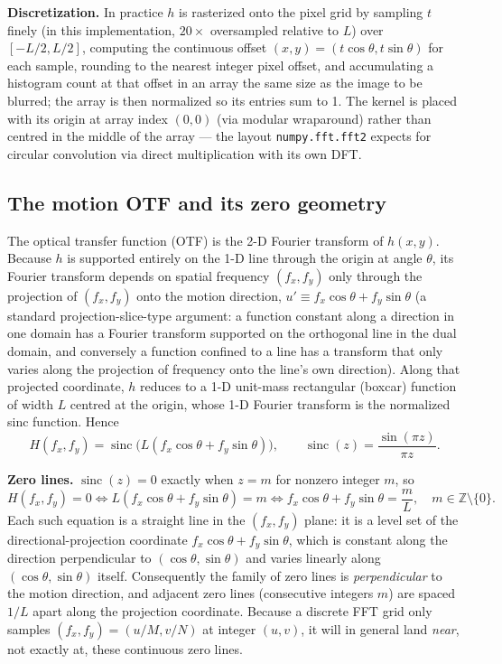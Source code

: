 \documentclass[11pt]{article}
\begin{document}
\textbf{Discretization.} In practice $h$ is rasterized onto the pixel grid by sampling $t$
finely (in this implementation, $20\times$ oversampled relative to $L$) over $[-L/2, L/2]$,
computing the continuous offset $(x,y) = (t\cos\theta, t\sin\theta)$ for each sample, rounding to
the nearest integer pixel offset, and accumulating a histogram count at that offset in an array
the same size as the image to be blurred; the array is then normalized so its entries sum to 1.
The kernel is placed with its origin at array index $(0,0)$ (via modular wraparound) rather than
centred in the middle of the array — the layout \texttt{numpy.fft.fft2} expects for circular
convolution via direct multiplication with its own DFT.

\subsection{The motion OTF and its zero geometry}

The optical transfer function (OTF) is the 2-D Fourier transform of $h(x,y)$. Because $h$ is
supported entirely on the 1-D line through the origin at angle $\theta$, its Fourier transform
depends on spatial frequency $(f_x,f_y)$ only through the projection of $(f_x,f_y)$ onto the
motion direction, $u' \equiv f_x\cos\theta + f_y\sin\theta$ (a standard projection-slice-type
argument: a function constant along a direction in one domain has a Fourier transform supported
on the orthogonal line in the dual domain, and conversely a function confined to a line has a
transform that only varies along the projection of frequency onto the line's own direction).
Along that projected coordinate, $h$ reduces to a 1-D unit-mass rectangular (boxcar) function of
width $L$ centred at the origin, whose 1-D Fourier transform is the normalized sinc function.
Hence
\[
H(f_x,f_y) = \operatorname{sinc}\!\big(L(f_x\cos\theta+f_y\sin\theta)\big),
\qquad \operatorname{sinc}(z) = \frac{\sin(\pi z)}{\pi z}.
\]

\textbf{Zero lines.} $\operatorname{sinc}(z)=0$ exactly when $z=m$ for nonzero integer $m$, so
\[
H(f_x,f_y) = 0 \iff L(f_x\cos\theta+f_y\sin\theta) = m \iff
f_x\cos\theta+f_y\sin\theta = \frac{m}{L}, \quad m\in\mathbb Z\setminus\{0\}.
\]
Each such equation is a straight line in the $(f_x,f_y)$ plane: it is a level set of the
directional-projection coordinate $f_x\cos\theta+f_y\sin\theta$, which is constant along the
direction perpendicular to $(\cos\theta,\sin\theta)$ and varies linearly along
$(\cos\theta,\sin\theta)$ itself. Consequently the family of zero lines is \emph{perpendicular}
to the motion direction, and adjacent zero lines (consecutive integers $m$) are spaced $1/L$
apart along the projection coordinate. Because a discrete FFT grid only samples
$(f_x,f_y)=(u/M,v/N)$ at integer $(u,v)$, it will in general land \emph{near}, not exactly at,
these continuous zero lines.
\end{document}
